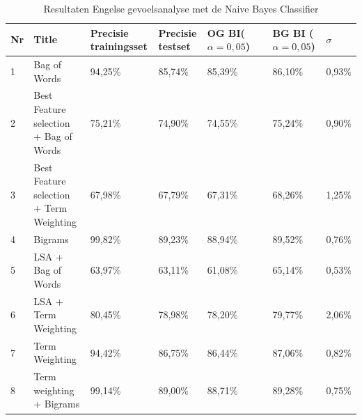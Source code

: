 \begin{table}
\centering
\caption{Resultaten Engelse gevoelsanalyse met de Naive Bayes Classifier}
\begin{adjustbox}{width=1\textwidth}
\begin{tabular}{|l|l|l|l|l|l|l|}
\hline
{\bf Nr} & {\bf Title}                                                                      & {\bf Precisie trainingsset} & {\bf Precisie testset} & {\bf OG BI($\alpha=0,05$)} & {\bf BG BI ($\alpha=0,05$)} & {\bf $\sigma$} \\ \hline
1        & Bag of Words                                                                     & 94,25\%                     & 85,74\%                & 85,39\%                 & 86,10\%                  & 0,93\%      \\ \hline
2        & Best Feature selection + Bag of Words                                            & 75,21\%                     & 74,90\%                & 74,55\%                 & 75,24\%                  & 0,90\%      \\ \hline
3        & Best Feature selection + Term Weighting                                          & 67,98\%                     & 67,79\%                & 67,31\%                 & 68,26\%                  & 1,25\%      \\ \hline
4        & Bigrams                                                                          & 99,82\%                     & 89,23\%                & 88,94\%                 & 89,52\%                  & 0,76\%      \\ \hline
5        & LSA + Bag of Words                                                               & 63,97\%                     & 63,11\%                & 61,08\%                 & 65,14\%                  & 0,53\%      \\ \hline
6        & LSA + Term Weighting                                                             & 80,45\%                     & 78,98\%                & 78,20\%                 & 79,77\%                  & 2,06\%      \\ \hline
7        & Term Weighting                                                                   & 94,42\%                     & 86,75\%                & 86,44\%                 & 87,06\%                  & 0,82\%      \\ \hline
8        & Term weighting  + Bigrams                                                        & 99,14\%                     & 89,00\%                & 88,71\%                 & 89,28\%                  & 0,75\%      \\ \hline

\end{tabular}
\end{adjustbox}
\end{table}
